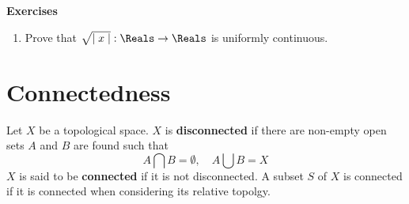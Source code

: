 


{\Large\textbf{Exercises}}
\begin{enumerate}
    \item Prove that \(\sqrt{\mid x \mid} :\Reals \to \Reals\) is uniformly continuous.
\end{enumerate}

\newpage
\section{Connectedness}
\begin{definition}
    Let \(X\) be a topological space. \(X\) is \textbf{disconnected} if there are non-empty open sets \(A\) and \( B\) are found such that
    \begin{equation*}
        A \bigcap B = \emptyset, \quad A \bigcup B = X
    \end{equation*}
    \(X\) is said to be \textbf{connected} if it is not disconnected. A subset \(S\) of \(X\) is connected if it is connected when considering its relative topolgy.
\end{definition}

